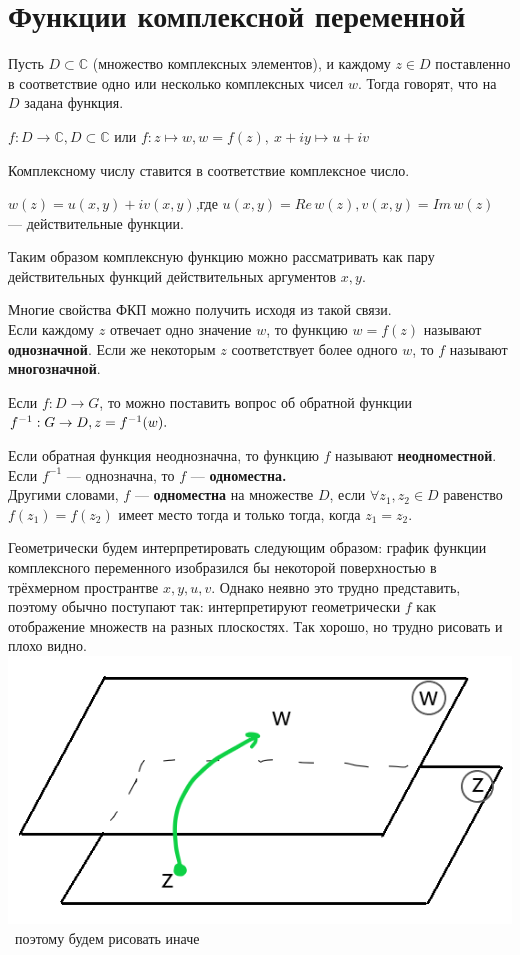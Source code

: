 \documentclass[a4paper, 12pt]{report}
\begin{document}
\section{Функции комплексной переменной}
\par\bigskip
Пусть $D \subset \mathbb{C}$ (множество комплексных элементов), и каждому $z \in D$ поставленно в соответствие одно или несколько комплексных чисел $w$. Тогда говорят, что на $D$ задана функция. 
\par\bigskip
$f: D \to \mathbb{C}, D \subset \mathbb{C}$ или $f: z \mapsto w, w = f(z), \ x + iy \longmapsto u + iv$
\par\bigskip Комплексному числу ставится в соответствие комплексное число.
\par $w(z) = u(x,y) + iv(x,y)$,\quad где $u(x,y) = Re\,w(z), v(x,y) = Im\,w(z)$ --- действительные функции. 
\par\bigskip Таким образом комплексную функцию можно рассматривать как пару действительных функций действительных аргументов $x, y$. 
\par\bigskip
 Многие свойства ФКП можно получить исходя из такой связи.
\\Если каждому $z$ отвечает одно значение $w$, то функцию $w = f(z)$ называют \textbf{однозначной}. Если же некоторым $z$ соответствует более одного $w$, то $f$ называют \textbf{многозначной}.
\par\bigskip
Если $f:D \to G$, то можно поставить вопрос об обратной функции $f^{-1}: G \to D, \\ z = f^{-1}(w).$
\par\bigskip
Если обратная функция неоднозначна, то функцию $f$ называют \textbf{неодноместной}. Если $f^{-1}$ --- однозначна, то $f$ --- \textbf{одноместна.}
\\Другими словами, $f$ --- \textbf{одноместна} на множестве $D$, если $\forall z_1, z_2 \in D$ равенство \\$f(z_1) = f(z_2)$ имеет место тогда и только тогда, когда $z_1 = z_2$. 
\par\bigskip
Геометрически  будем интерпретировать следующим образом: график функции комплексного переменного изобразился бы некоторой  поверхностью в трёхмерном пространтве $x, y, u, v$. Однако неявно это трудно представить, поэтому обычно поступают так: интерпретируют геометрически $f$ как отображение множеств на разных плоскостях. Так хорошо, но трудно рисовать и плохо видно.
\\ 
\includegraphics[scale = 0.75]{im1} \ поэтому будем рисовать иначе
\end{document}
